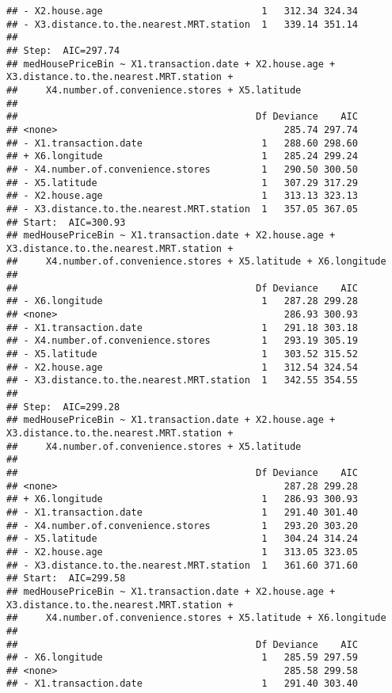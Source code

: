 \documentclass[
]{article}
\begin{document}
\begin{verbatim}
## - X2.house.age                            1   312.34 324.34
## - X3.distance.to.the.nearest.MRT.station  1   339.14 351.14
## 
## Step:  AIC=297.74
## medHousePriceBin ~ X1.transaction.date + X2.house.age + X3.distance.to.the.nearest.MRT.station + 
##     X4.number.of.convenience.stores + X5.latitude
## 
##                                          Df Deviance    AIC
## <none>                                        285.74 297.74
## - X1.transaction.date                     1   288.60 298.60
## + X6.longitude                            1   285.24 299.24
## - X4.number.of.convenience.stores         1   290.50 300.50
## - X5.latitude                             1   307.29 317.29
## - X2.house.age                            1   313.13 323.13
## - X3.distance.to.the.nearest.MRT.station  1   357.05 367.05
## Start:  AIC=300.93
## medHousePriceBin ~ X1.transaction.date + X2.house.age + X3.distance.to.the.nearest.MRT.station + 
##     X4.number.of.convenience.stores + X5.latitude + X6.longitude
## 
##                                          Df Deviance    AIC
## - X6.longitude                            1   287.28 299.28
## <none>                                        286.93 300.93
## - X1.transaction.date                     1   291.18 303.18
## - X4.number.of.convenience.stores         1   293.19 305.19
## - X5.latitude                             1   303.52 315.52
## - X2.house.age                            1   312.54 324.54
## - X3.distance.to.the.nearest.MRT.station  1   342.55 354.55
## 
## Step:  AIC=299.28
## medHousePriceBin ~ X1.transaction.date + X2.house.age + X3.distance.to.the.nearest.MRT.station + 
##     X4.number.of.convenience.stores + X5.latitude
## 
##                                          Df Deviance    AIC
## <none>                                        287.28 299.28
## + X6.longitude                            1   286.93 300.93
## - X1.transaction.date                     1   291.40 301.40
## - X4.number.of.convenience.stores         1   293.20 303.20
## - X5.latitude                             1   304.24 314.24
## - X2.house.age                            1   313.05 323.05
## - X3.distance.to.the.nearest.MRT.station  1   361.60 371.60
## Start:  AIC=299.58
## medHousePriceBin ~ X1.transaction.date + X2.house.age + X3.distance.to.the.nearest.MRT.station + 
##     X4.number.of.convenience.stores + X5.latitude + X6.longitude
## 
##                                          Df Deviance    AIC
## - X6.longitude                            1   285.59 297.59
## <none>                                        285.58 299.58
## - X1.transaction.date                     1   291.40 303.40

\end{verbatim}
\end{document}
